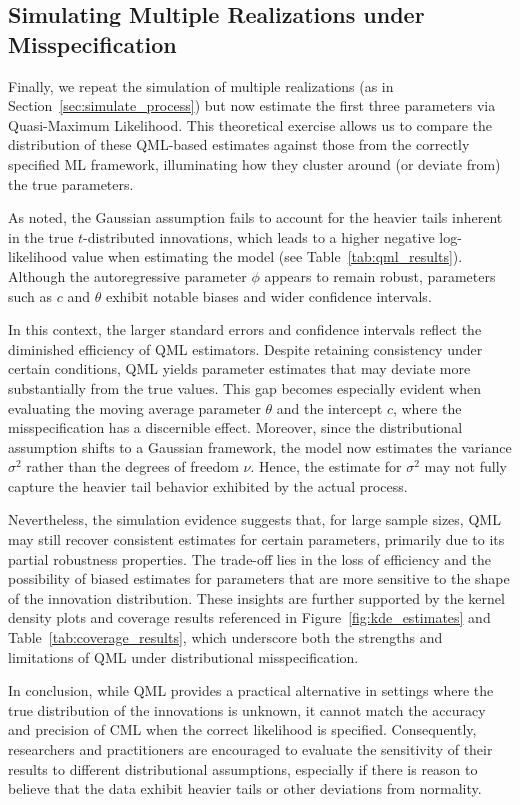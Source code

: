 \documentclass[a4paper,12pt]{article}
\begin{document}
\subsection{Simulating Multiple Realizations under Misspecification}
\label{sec:simulate_misspec}
Finally, we repeat the simulation of multiple realizations (as in Section~\ref{sec:simulate_process}) but now estimate the first three parameters via Quasi-Maximum Likelihood. This theoretical exercise allows us to compare the distribution of these QML-based estimates against those from the correctly specified ML framework, illuminating how they cluster around (or deviate from) the true parameters.

As noted, the Gaussian assumption fails to account for the heavier tails inherent in the true \(t\)-distributed innovations, which leads to a higher negative log-likelihood value when estimating the model (see Table~\ref{tab:qml_results}). Although the autoregressive parameter \(\phi\) appears to remain robust, parameters such as \(c\) and \(\theta\) exhibit notable biases and wider confidence intervals.

In this context, the larger standard errors and confidence intervals reflect the diminished efficiency of QML estimators. Despite retaining consistency under certain conditions, QML yields parameter estimates that may deviate more substantially from the true values. This gap becomes especially evident when evaluating the moving average parameter \(\theta\) and the intercept \(c\), where the misspecification has a discernible effect. Moreover, since the distributional assumption shifts to a Gaussian framework, the model now estimates the variance \(\sigma^2\) rather than the degrees of freedom \(\nu\). Hence, the estimate for \(\sigma^2\) may not fully capture the heavier tail behavior exhibited by the actual process.

Nevertheless, the simulation evidence suggests that, for large sample sizes, QML may still recover consistent estimates for certain parameters, primarily due to its partial robustness properties. The trade-off lies in the loss of efficiency and the possibility of biased estimates for parameters that are more sensitive to the shape of the innovation distribution. These insights are further supported by the kernel density plots and coverage results referenced in Figure~\ref{fig:kde_estimates} and Table~\ref{tab:coverage_results}, which underscore both the strengths and limitations of QML under distributional misspecification.

In conclusion, while QML provides a practical alternative in settings where the true distribution of the innovations is unknown, it cannot match the accuracy and precision of CML when the correct likelihood is specified. Consequently, researchers and practitioners are encouraged to evaluate the sensitivity of their results to different distributional assumptions, especially if there is reason to believe that the data exhibit heavier tails or other deviations from normality.
\end{document}
